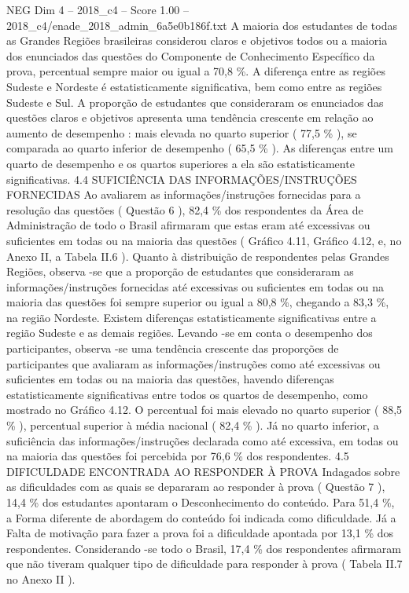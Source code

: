 \begin{textsample}{NEG Dim 4 – 2018\_c4 – Score 1.00 – 2018\_c4/enade\_2018\_admin\_6a5e0b186f.txt}
A maioria dos estudantes de todas as Grandes Regiões brasileiras considerou claros e objetivos todos ou a maioria dos enunciados das questões do Componente de Conhecimento Específico da prova, percentual sempre maior ou igual a 70,8 \%.
A diferença entre as regiões Sudeste e Nordeste é estatisticamente significativa, bem como entre as regiões Sudeste e Sul.
A proporção de estudantes que consideraram os enunciados das questões claros e objetivos apresenta uma tendência crescente em relação ao aumento de desempenho : mais elevada no quarto superior ( 77,5 \% ), se comparada ao quarto inferior de desempenho ( 65,5 \% ).
As diferenças entre um quarto de desempenho e os quartos superiores a ela são estatisticamente significativas. 4.4 SUFICIÊNCIA DAS INFORMAÇÕES/INSTRUÇÕES FORNECIDAS Ao avaliarem as informações/instruções fornecidas para a resolução das questões ( Questão 6 ), 82,4 \% dos respondentes da Área de Administração de todo o Brasil afirmaram que estas eram até excessivas ou suficientes em todas ou na maioria das questões ( Gráfico 4.11, Gráfico 4.12, e, no Anexo II, a Tabela II.6 ).
Quanto à distribuição de respondentes pelas Grandes Regiões, observa -se que a proporção de estudantes que consideraram as informações/instruções fornecidas até excessivas ou suficientes em todas ou na maioria das questões foi sempre superior ou igual a 80,8 \%, chegando a 83,3 \%, na região Nordeste.
Existem diferenças estatisticamente significativas entre a região Sudeste e as demais regiões.
Levando -se em conta o desempenho dos participantes, observa -se uma tendência crescente das proporções de participantes que avaliaram as informações/instruções como até excessivas ou suficientes em todas ou na maioria das questões, havendo diferenças estatisticamente significativas entre todos os quartos de desempenho, como mostrado no Gráfico 4.12.
O percentual foi mais elevado no quarto superior ( 88,5 \% ), percentual superior à média nacional ( 82,4 \% ).
Já no quarto inferior, a suficiência das informações/instruções declarada como até excessiva, em todas ou na maioria das questões foi percebida por 76,6 \% dos respondentes. 4.5 DIFICULDADE ENCONTRADA AO RESPONDER À PROVA Indagados sobre as dificuldades com as quais se depararam ao responder à prova ( Questão 7 ), 14,4 \% dos estudantes apontaram o Desconhecimento do conteúdo.
Para 51,4 \%, a Forma diferente de abordagem do conteúdo foi indicada como dificuldade.
Já a Falta de motivação para fazer a prova foi a dificuldade apontada por 13,1 \% dos respondentes.
Considerando -se todo o Brasil, 17,4 \% dos respondentes afirmaram que não tiveram qualquer tipo de dificuldade para responder à prova ( Tabela II.7 no Anexo II ).

\end{textsample}
